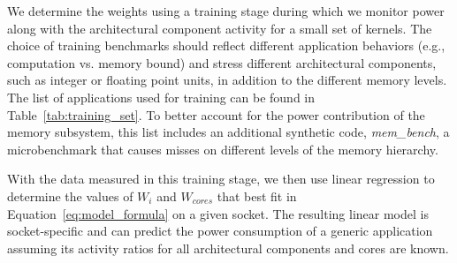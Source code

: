 We determine the weights
using a
training stage during which we monitor power along with the architectural component activity for a small set of kernels.  The choice of training benchmarks should reflect different application behaviors (e.g., computation vs. memory bound) and stress different architectural components, such as integer or floating point units, in addition to
the different memory levels.  
The list of applications used for training can be found in Table~\ref{tab:training_set}. 
To better account for the power contribution of the memory subsystem, this list includes an additional synthetic code, \textit{mem\_bench}, a microbenchmark that causes misses on different levels of the memory hierarchy. %

With the data measured in this training stage, we then use
linear regression to determine the values of $W_i$ and $W_{cores}$ that best fit in Equation~\ref{eq:model_formula}
on a given socket.  
The resulting linear model is socket-specific and can predict the power consumption of a generic application assuming its activity ratios for all architectural components and cores are known.

